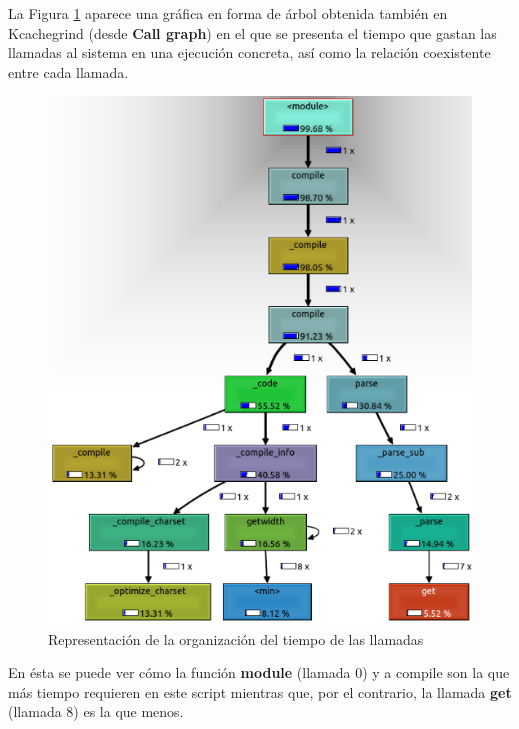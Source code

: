 La Figura \ref{fig:figura85} aparece una gráfica en forma de árbol obtenida también en Kcachegrind (desde \textbf{Call graph}) en el que se presenta el tiempo que gastan las llamadas al sistema en una ejecución concreta, así como la relación coexistente entre cada llamada.

\begin{figure}[H]
	\centering
	\includegraphics[scale=0.8]{figuras/ejercicio8/figura5.png} 
	\caption{Representación de la organización del tiempo de las llamadas} 
	\label{fig:figura85}
\end{figure}

En ésta se puede ver cómo la función \textbf{module} (llamada 0) y a compile son la que más tiempo requieren en este script mientras que, por el contrario, la llamada \textbf{get} (llamada 8) es la que menos.
\newpage


